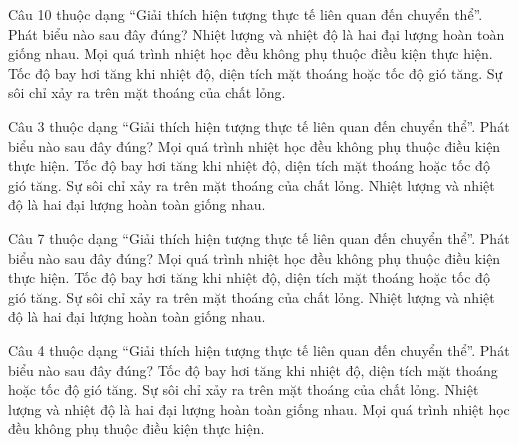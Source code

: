 
\begin{ex}
Câu 10 thuộc dạng “Giải thích hiện tượng thực tế liên quan đến chuyển thể”. Phát biểu nào sau đây đúng?
\choice
{Nhiệt lượng và nhiệt độ là hai đại lượng hoàn toàn giống nhau.}
{Mọi quá trình nhiệt học đều không phụ thuộc điều kiện thực hiện.}
{\True Tốc độ bay hơi tăng khi nhiệt độ, diện tích mặt thoáng hoặc tốc độ gió tăng.}
{Sự sôi chỉ xảy ra trên mặt thoáng của chất lỏng.}
\end{ex}

\begin{ex}
Câu 3 thuộc dạng “Giải thích hiện tượng thực tế liên quan đến chuyển thể”. Phát biểu nào sau đây đúng?
\choice
{Mọi quá trình nhiệt học đều không phụ thuộc điều kiện thực hiện.}
{\True Tốc độ bay hơi tăng khi nhiệt độ, diện tích mặt thoáng hoặc tốc độ gió tăng.}
{Sự sôi chỉ xảy ra trên mặt thoáng của chất lỏng.}
{Nhiệt lượng và nhiệt độ là hai đại lượng hoàn toàn giống nhau.}
\end{ex}

\begin{ex}
Câu 7 thuộc dạng “Giải thích hiện tượng thực tế liên quan đến chuyển thể”. Phát biểu nào sau đây đúng?
\choice
{Mọi quá trình nhiệt học đều không phụ thuộc điều kiện thực hiện.}
{\True Tốc độ bay hơi tăng khi nhiệt độ, diện tích mặt thoáng hoặc tốc độ gió tăng.}
{Sự sôi chỉ xảy ra trên mặt thoáng của chất lỏng.}
{Nhiệt lượng và nhiệt độ là hai đại lượng hoàn toàn giống nhau.}
\end{ex}

\begin{ex}
Câu 4 thuộc dạng “Giải thích hiện tượng thực tế liên quan đến chuyển thể”. Phát biểu nào sau đây đúng?
\choice
{\True Tốc độ bay hơi tăng khi nhiệt độ, diện tích mặt thoáng hoặc tốc độ gió tăng.}
{Sự sôi chỉ xảy ra trên mặt thoáng của chất lỏng.}
{Nhiệt lượng và nhiệt độ là hai đại lượng hoàn toàn giống nhau.}
{Mọi quá trình nhiệt học đều không phụ thuộc điều kiện thực hiện.}
\end{ex}

